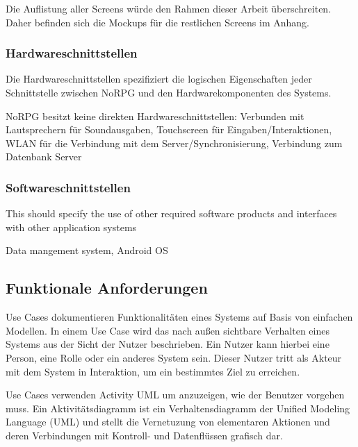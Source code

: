 			Die Auflistung aller Screens würde den Rahmen dieser Arbeit überschreiten. Daher befinden sich die Mockups für die restlichen Screens im Anhang.
						
			
		
		\subsubsection{Hardwareschnittstellen}
			Die Hardwareschnittstellen spezifiziert die logischen Eigenschaften jeder Schnittstelle zwischen NoRPG und den Hardwarekomponenten des Systems.
			
			NoRPG besitzt keine direkten Hardwareschnittstellen: Verbunden mit Lautsprechern für Soundausgaben, Touchscreen für Eingaben/Interaktionen, WLAN für die Verbindung mit dem Server/Synchronisierung, Verbindung zum Datenbank Server
			
		\subsubsection{Softwareschnittstellen}
			This should specify the use of other required software products and interfaces with other application systems 
			
			Data mangement system, Android OS

	\subsection{Funktionale Anforderungen}
		Use Cases dokumentieren Funktionalitäten eines Systems auf Basis von einfachen Modellen. In einem Use Case wird das nach außen sichtbare Verhalten eines Systems aus der Sicht der Nutzer beschrieben. Ein Nutzer kann hierbei eine Person, eine Rolle oder ein anderes System sein. Dieser Nutzer tritt als Akteur mit dem System in Interaktion, um ein bestimmtes Ziel zu erreichen. %
		
		Use Cases verwenden Activity UML um anzuzeigen, wie der Benutzer vorgehen muss. Ein Aktivitätsdiagramm ist ein Verhaltensdiagramm der Unified Modeling Language (UML) und stellt die Vernetuzung von elementaren Aktionen und deren Verbindungen mit Kontroll- und Datenflüssen grafisch dar.
	
